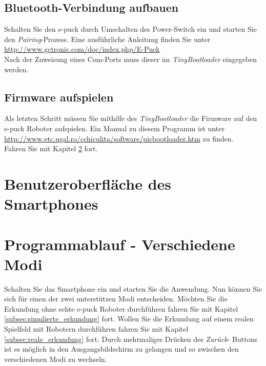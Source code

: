 \documentclass[10pt,a4paper]{article}
\let\oldsection\section
\renewcommand{\section}{\newpage \oldsection}
\begin{document}
			\subsection{Bluetooth-Verbindung aufbauen} 
				Schalten Sie den e-puck durch Umschalten des Power-Switch ein und starten Sie den \textit{Pairing}-Prozess. Eine ausf\"uhrliche Anleitung finden Sie
				unter  \\ \url{http://www.gctronic.com/doc/index.php/E-Puck} \\
				Nach der Zuweisung eines Com-Ports muss dieser im \textit{TinyBootloader} eingegeben werden.			
			\subsection{Firmware aufspielen} 
				Als letzten Schritt m\"ussen Sie mithilfe des \textit{TinyBootloader} die Firmware auf den e-puck Roboter aufspielen. Ein Manual zu diesem Programm
				ist unter \url{http://www.etc.ugal.ro/cchiculita/software/picbootloader.htm} zu finden. \\
				Fahren Sie mit Kapitel \ref{programmstart_ablauf} fort.
\section{Benutzeroberfl\"ache des Smartphones}


\section{Programmablauf - Verschiedene Modi}
\label{programmstart_ablauf}
		Schalten Sie das Smartphone ein und starten Sie die Anwendung. Nun k\"onnen Sie sich f\"ur einen der zwei unterst\"utzen Modi entscheiden. M\"ochten Sie
		die Erkundung ohne echte e-puck Roboter durchf\"uhren fahren Sie mit  Kapitel \ref{subsec:simulierte_erkundung} fort. Wollen Sie die Erkundung auf einem
		realen Spielfeld mit Robotern durchf\"uhren fahren Sie mit Kapitel  \ref{subsec:reale_erkundung} fort. Durch mehrmaliges Dr\"ucken des \textit{Zur\"uck}-
		Buttons ist es m\"oglich in den Ausgangsbildschirm zu gelangen und so zwischen den verschiedenen Modi zu wechseln.
\end{document}
